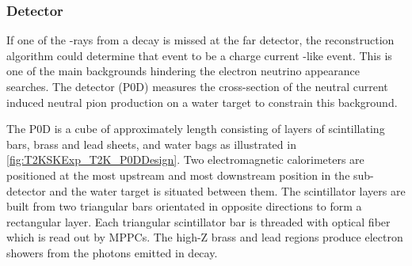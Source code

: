 \subsubsection{ Detector}
\label{subsubsec:T2KSKExp_T2K_P0D}

If one of the \quickmath{\gamma}-rays from a \quickmath{\pi^0 \rightarrow 2\gamma} decay is missed at the far detector, the reconstruction algorithm could determine that event to be a charge current -like event. This is one of the main backgrounds hindering the electron neutrino appearance searches. The  detector (P0D) measures the cross-section of the neutral current induced neutral pion production on a water target to constrain this background.

The P0D is a cube of approximately  length consisting of layers of scintillating bars, brass and lead sheets, and water bags as illustrated in \autoref{fig:T2KSKExp_T2K_P0DDesign}. Two electromagnetic calorimeters are positioned at the most upstream and most downstream position in the sub-detector and the water target is situated between them. The scintillator layers are built from two triangular bars orientated in opposite directions to form a rectangular layer. Each triangular scintillator bar is threaded with optical fiber which is read out by MPPCs. The high-Z brass and lead regions produce electron showers from the photons emitted in  decay.

